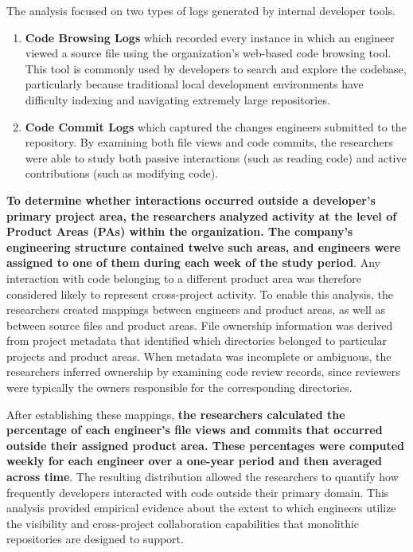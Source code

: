 The analysis focused on two types of logs generated by internal developer tools.
\begin{enumerate}
    \item \textbf{Code Browsing Logs} which recorded every instance in which an engineer viewed a source file using the organization's web-based code browsing tool. This tool is commonly used by developers to search and explore the codebase, particularly because traditional local development environments have difficulty indexing and navigating extremely large repositories.
    \item \textbf{Code Commit Logs} which captured the changes engineers submitted to the repository. By examining both file views and code commits, the researchers were able to study both passive interactions (such as reading code) and active contributions (such as modifying code).
\end{enumerate}
\textbf{To determine whether interactions occurred outside a developer's primary project area, the researchers analyzed activity at the level of Product Areas (PAs) within the organization. The company's engineering structure contained twelve such areas, and engineers were assigned to one of them during each week of the study period}. Any interaction with code belonging to a different product area was therefore considered likely to represent cross-project activity. To enable this analysis, the researchers created mappings between engineers and product areas, as well as between source files and product areas. File ownership information was derived from project metadata that identified which directories belonged to particular projects and product areas. When metadata was incomplete or ambiguous, the researchers inferred ownership by examining code review records, since reviewers were typically the owners responsible for the corresponding directories.

After establishing these mappings, \textbf{the researchers calculated the percentage of each engineer's file views and commits that occurred outside their assigned product area. These percentages were computed weekly for each engineer over a one-year period and then averaged across time}. The resulting distribution allowed the researchers to quantify how frequently developers interacted with code outside their primary domain. This analysis provided empirical evidence about the extent to which engineers utilize the visibility and cross-project collaboration capabilities that monolithic repositories are designed to support.


